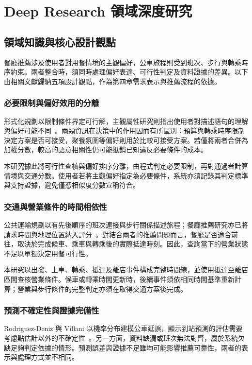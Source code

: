 \chapter{Deep Research 領域深度研究}

\section{領域知識與核心設計觀點}

餐廳推薦涉及使用者對用餐情境的主觀偏好，公車旅程則受到班次、步行與轉乘時序約束。兩者整合時，須同時處理偏好表達、可行性判定及資料證據的差異。以下由相關文獻歸納五項設計觀點，作為第四章需求表示與推薦流程的依據。

\subsection{必要限制與偏好效用的分離}

形式化規劃以限制條件界定可行解，主觀屬性研究則指出使用者對描述語句的理解與偏好可能不同~\cite{llm_planning_tools,subjective_attributes}。兩類資訊在決策中的作用因而有所區別：預算與轉乘時序限制決定方案是否可接受，聚餐氛圍等偏好則用於比較可接受方案。若僅將兩者合併為加權分數，較高的語意相關性仍可能抵銷已知違反必要條件的成本。

本研究據此將可行性查核與偏好排序分離，由程式判定必要限制，再對通過者計算情境與交通分數。使用者若將主觀偏好指定為必要條件，系統亦須記錄其判定標準與支持證據，避免僅憑相似度分數宣稱符合。

\subsection{交通與營業條件的時間相依性}

公共運輸規劃以有先後順序的班次連接與步行關係描述旅程；餐廳推薦研究亦已將請求時間與地理位置納入評分~\cite{bus_dynamic_replanning,restaurant_habib}。對結合兩者的推薦問題而言，餐廳是否適合前往，取決於完成候車、乘車與轉乘後的實際抵達時刻。因此，查詢當下的營業狀態不足以單獨決定用餐可行性。

本研究以出發、上車、轉乘、抵達及離店事件構成完整時間線，並使用抵達至離店區間查核營業條件。候車或轉乘時間更新時，後續事件須依相同時間基準重新計算；營業與步行條件的完整判定亦須在取得交通方案後完成。

\subsection{預測不確定性與證據完備性}

Rodriguez-Deniz 與 Villani 以機率分布建模公車延誤，顯示到站預測的評估需要考慮點估計以外的不確定性~\cite{bus_delay_uncertainty}。另一方面，資料缺漏或班次無法對齊，屬於系統欠缺足夠判定依據的情形。預測誤差與證據不足雖均可能影響推薦可靠性，兩者的表示與處理方式並不相同。

